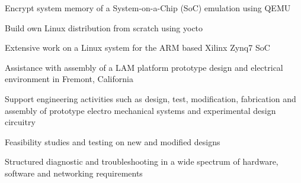 \documentclass[]{resume}
\begin{document}
\begin{minipage}[t]{0.66\textwidth}
 
	\begin{tightemize}

	\item Encrypt system memory of a System-on-a-Chip (SoC) emulation using QEMU
	\item Build own Linux distribution from scratch using yocto
	\item Extensive work on a Linux system for the ARM based Xilinx Zynq7 SoC

	\end{tightemize}
	\sectionsep
 
	\begin{tightemize}

	\item Assistance with assembly of a LAM platform prototype design and electrical environment in Fremont, California
	\item Support engineering activities such as design, test, modification, fabrication and assembly of prototype electro mechanical systems and experimental design circuitry
	\item Feasibility studies and testing on new and modified designs
	\item Structured diagnostic and troubleshooting in a wide spectrum of hardware, software and networking requirements

	\end{tightemize}
	\sectionsep
\end{minipage} 
\vfill \vfill \vfill \vfill
\pagebreak
\end{document}
